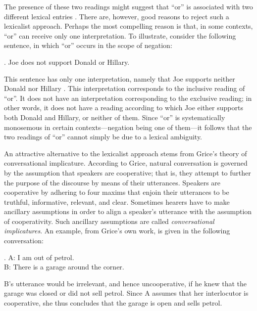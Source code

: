 \documentclass[12pt]{article}
\begin{document}
The presence of these two readings might suggest that ``or'' is associated with two different lexical entries \citep[e.g.,][]{basson1960, baum1996, rescher1964}. There are, however, good reasons to reject such a lexicalist approach. Perhaps the most compelling reason is that, in some contexts, ``or'' can receive only one interpretation. To illustrate, consider the following sentence, in which ``or'' occurs in the scope of negation:

\ex.	 Joe does not support Donald or Hillary.

This sentence has only one interpretation, namely that Joe supports neither Donald nor Hillary \citep[cf.][]{crain2008}. This interpretation corresponds to the inclusive reading of ``or''. It does not have an interpretation corresponding to the exclusive reading; in other words, it does not have a reading according to which Joe either supports both Donald and Hillary, or neither of them. Since ``or'' is systematically monosemous in certain contexts---negation being one of them---it follows that the two readings of ``or'' cannot simply be due to a lexical ambiguity.

An attractive alternative to the lexicalist approach stems from Grice's \citeyearpar{grice1975} theory of conversational implicature. According to Grice, natural conversation is governed by the assumption that speakers are cooperative; that is, they attempt to further the purpose of the discourse by means of their utterances. Speakers are cooperative by adhering to four maxims that enjoin their utterances to be truthful, informative, relevant, and clear. Sometimes hearers have to make ancillary assumptions in order to align a speaker's utterance with the assumption of cooperativity. Such ancillary assumptions are called \emph{conversational implicatures}. An example, from Grice's own work, is given in the following conversation:

\ex.	A: I am out of petrol. \\
 B: There is a garage around the corner.
	
B's utterance would be irrelevant, and hence uncooperative, if he knew that the garage was closed or did not sell petrol. Since A assumes that her interlocutor is cooperative, she thus concludes that the garage is open and sells petrol.
\end{document}
